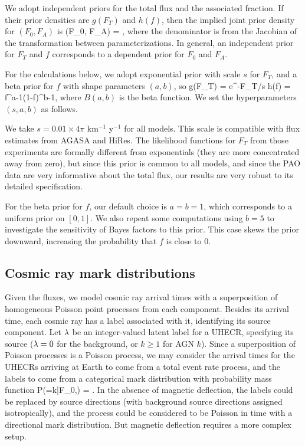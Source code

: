 We adopt independent priors for the total flux and the associated fraction.
If their prior densities are $g(F_T)$ and $h(f)$, then the implied
joint prior density for $(F_0,F_A)$ is
\be
\pi(F_0, F_A) =
  ,
\label{FF-prior}
\ee
where the denominator is from the Jacobian of the transformation between
parameterizations.  In general, an independent prior for $F_T$ and $f$
corresponds to a dependent prior for $F_0$ and $F_A$.

For the calculations below, we adopt exponential prior with scale $s$ for
$F_T$, and a beta prior for $f$ with shape parameters $(a,b)$, so
\be
g(F_T) = e^{-F_T/s}
\quad{}\quad
h(f) =  f^{a-1}(1-f)^{b-1},
\label{exp-beta}
\ee
where $B(a,b)$ is the beta function.  We set the hyperparameters $(s,a,b)$
as follows.

We take $s = 0.01\times 4\pi$ km$^{-1}$ y$^{-1}$ for all models.  This scale
is compatible with flux estimates from AGASA and HiRes.  The likelihood
functions for $F_T$ from those experiments are formally different from
exponentials (they are more concentrated away from zero), but since this
prior is common to all models, and since the PAO data are very informative
about the total flux, our results are very robust to its detailed
specification.

For the beta prior for $f$, our default choice is $a=b=1$, which corresponds
to a uniform prior on $[0,1]$.  We also repeat some computations using $b=5$
to investigate the sensitivity of Bayes factors to this prior.  This case
skews the prior downward, increasing the probability that $f$ is close to 0.

\subsection{Cosmic ray mark distributions}

Given the fluxes, we model cosmic ray arrival times with a superposition of
homogeneous Poisson point processes from each component.  Besides its
arrival time, each cosmic ray has a label associated with it, identifying
its source component. Let $\lambda$ be an integer-valued latent label for a
UHECR, specifying its source ($\lambda = 0$ for the background, or $k \ge 1$
for AGN $k$).  Since a superposition of Poisson processes is a Poisson
process, we may consider the arrival times for the UHECRs arriving at Earth
to come from a total event rate process, and the labels to come from a
categorical mark distribution with probability mass function
\be
P(\lambda=k|F_0,\Fvec) = .
\label{label-pmf}
\ee
In the absence of magnetic deflection, the labels could be replaced by
source directions (with background source directions assigned
isotropically), and the process could be considered to be Poisson in time
with a directional mark distribution.  But magnetic deflection requires a
more complex setup.

